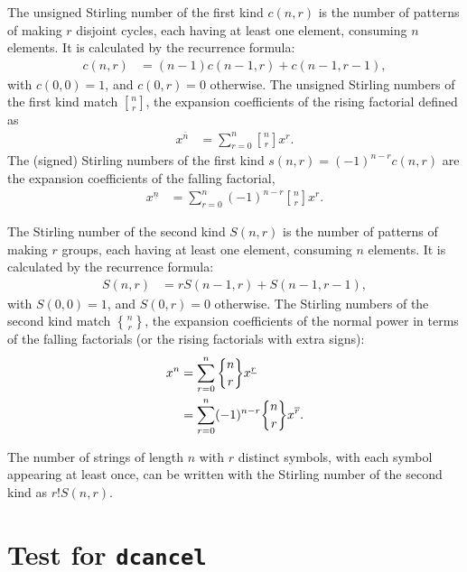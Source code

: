 \documentclass[amsmath,amssymb,prc,aps]{revtex4-2}
\begin{document}
\newcommand{\stirbrack}[2]{\genfrac{[}{]}{0pt}{}{#1}{#2}}
\newcommand{\stirbrace}[2]{\genfrac{\{}{\}}{0pt}{}{#1}{#2}}

The unsigned Stirling number of the first kind $c(n, r)$ is the number of
patterns of making $r$ disjoint cycles, each having at least one element,
consuming $n$ elements.  It is calculated by the recurrence formula:
\begin{align}
  c(n,r) &= (n-1) c(n-1, r) + c(n-1, r-1),
\end{align}
with $c(0,0) = 1$, and $c(0, r) = 0$ otherwise.  The unsigned Stirling numbers
of the first kind match $\stirbrack{n}{r}$, the expansion coefficients of the
rising factorial defined as
\begin{align}
  x^{\overline{n}} &= \sum_{r=0}^n \stirbrack{n}{r} x^r.
\end{align}
The (signed) Stirling numbers of the first kind $s(n, r) = (-1)^{n-r} c(n,r)$
are the expansion coefficients of the falling factorial,
\begin{align}
  x^{\underline{n}} &= \sum_{r=0}^n (-1)^{n-r} \stirbrack{n}{r} x^r.
\end{align}

The Stirling number of the second kind $S(n,r)$ is the number of patterns of
making $r$ groups, each having at least one element, consuming $n$ elements.
It is calculated by the recurrence formula:
\begin{align}
  S(n,r) &= r S(n-1, r) + S(n-1, r-1),
\end{align}
with $S(0,0) = 1$, and $S(0, r) = 0$ otherwise.  The Stirling numbers of the
second kind match $\stirbrace{n}{r}$, the expansion coefficients of the normal
power in terms of the falling factorials (or the rising factorials with extra
signs):
\begin{align}
  x^n
  &= \sum_{r=0}^n \stirbrace{n}{r} x^{\underline{r}} \notag \\
  &= \sum_{r=0}^n (-1)^{n-r} \stirbrace{n}{r} x^{\overline{r}}.
\end{align}

The number of strings of length $n$ with $r$ distinct symbols, with each symbol
appearing at least once, can be written with the Stirling number of the second
kind as $r! S(n, r)$.

\appendix
\section{Test for \texttt{dcancel}}
\end{document}
